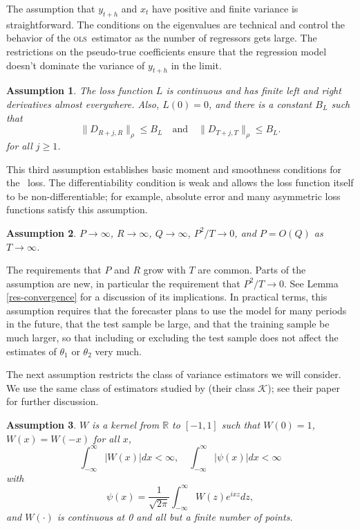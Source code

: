 \documentclass[11pt]{article}
\newtheorem{asmp}{Assumption}
\newcommand{\h}{h}
\newcommand{\ols}{\textsc{ols}}
\renewcommand{\Re}{\ensuremath{\mathbb{R}}}
\begin{document}
The assumption that $y_{t+\h}$ and $x_t$ have positive and finite
variance is straightforward.  The conditions on the eigenvalues are
technical and control the behavior of the \ols\ estimator as the
number of regressors gets large.  The restrictions on the pseudo-true
coefficients ensure that the regression model doesn't dominate the
variance of $y_{t+\h}$ in the limit.  

\begin{asmp}\label{asmp-3}
  The loss function $L$ is continuous and has finite left and right
  derivatives almost everywhere.  Also, $L(0) = 0$, and there is a
  constant $B_L$ such that
  \begin{equation*}
    \|D_{R+j,R}\|_\rho \leq B_L \quad\text{and}\quad
    \|D_{T+j,T}\|_\rho \leq B_L.
  \end{equation*}
  for all $j \geq 1$.
\end{asmp}

This third assumption establishes basic moment and smoothness
conditions for the \oos\ loss.  The differentiability
condition is weak and allows the loss function itself to be
non-differentiable; for example, absolute error and many asymmetric loss functions
satisfy this assumption.

\begin{asmp} \label{asmp-4} $P\to\infty$,
  $R\to\infty$, $Q\to\infty$, $P^2/T \to 0$, and $P = O(Q)$ as $T \to \infty$.
\end{asmp}

The requirements that $P$ and $R$ grow with $T$ are common.  Parts of
the assumption are new, in particular the requirement that $P^2/T \to
0$.  See Lemma \ref{res-convergence} for a discussion of its
implications.  In practical terms, this assumption requires that the
forecaster plans to use the model for many periods in the future, that
the test sample be large, and that the training sample be much larger,
so that including or excluding the test sample does not affect the
estimates of $\theta_1$ or $\theta_2$ very much.

The next assumption restricts the class of variance estimators we will
consider.  We use the same class of estimators studied by
\citet{DeD:00} (their class $\mathcal{K}$); see
their paper for further discussion.

\begin{asmp}
  \label{asmp-5} $W$ is a kernel from 
$\Re$ to $[-1,1]$ such that $W(0) = 1$, $W(x) = W(-x)$ for all $x$,
\begin{equation*}
    \int_{-\infty}^{\infty} \lvert W(x) \rvert dx < \infty, \quad
    \int_{-\infty}^{\infty} \lvert \psi(x) \rvert dx < \infty
\end{equation*}
with
\begin{equation*} \psi(x) = \frac1{\sqrt{2\pi}} \int_{-\infty}^{\infty} W(z) e^{ixz}dz,
\end{equation*}
and $W(\cdot)$ is continuous at 0 and all but a finite number of
points.
\end{asmp}
\end{document}
